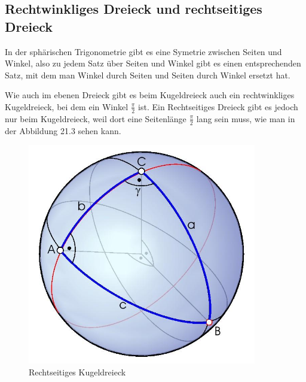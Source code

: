 \subsection{Rechtwinkliges Dreieck und rechtseitiges Dreieck}
In der sphärischen Trigonometrie gibt es eine Symetrie zwischen Seiten und Winkel, also zu jedem Satz über Seiten und Winkel gibt es einen entsprechenden Satz, mit dem man Winkel durch Seiten und Seiten durch Winkel ersetzt hat.

Wie auch im ebenen Dreieck gibt es beim Kugeldreieck auch ein rechtwinkliges Kugeldreieck, bei dem ein Winkel $\frac{\pi}{2}$ ist. 
Ein Rechtseitiges Dreieck gibt es jedoch nur beim Kugeldreieck, weil dort eine Seitenlänge $\frac{\pi}{2}$ lang sein muss, wie man in der Abbildung 21.3 sehen kann.

\begin{figure}
	
	\begin{center}
		\includegraphics[width=10cm]{papers/nav/bilder/recht.jpg}
		\caption[Rechtseitiges Kugeldreieck]{Rechtseitiges Kugeldreieck}
	\end{center}	
\end{figure}

